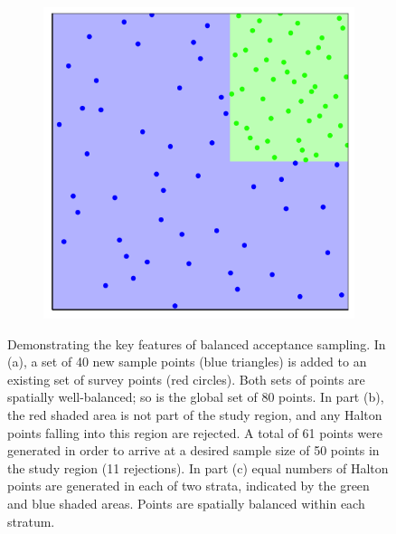 \documentclass[a4paper,11pt]{article} %
\begin{document}
\begin{figure}[htbp]
\begin{subfigure}[b]{0.3\textwidth}
    \caption{}
  \end{subfigure}
  \begin{subfigure}[b]{0.3\textwidth}
    \includegraphics[width=\textwidth]{p5.png}
    \caption{}
  \end{subfigure}
  \caption{Demonstrating the key features of balanced acceptance sampling. In (a), a set of 40 new sample points (blue triangles) is added to an existing set of survey points (red circles). Both sets of points are spatially well-balanced; so is the global set of 80 points. In part (b), the red shaded area is not part of the study region, and any Halton points falling into this region are rejected. A total of 61 points were generated in order to arrive at a desired sample size of 50 points in the study region (11 rejections). In part (c) equal numbers of Halton points are generated in each of two strata, indicated by the green and blue shaded areas. Points are spatially balanced within each stratum.}
  \label{h345}
\end{figure}
\end{document}
